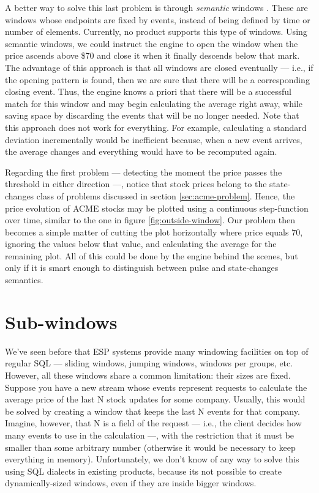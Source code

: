 \documentclass[a4,11pt]{report}
\begin{document}
A better way to solve this last problem is through \emph{semantic}
windows \cite{semantic-windows}. These are windows whose endpoints are
fixed by events, instead of being defined by time or number of
elements. Currently, no product supports this type of windows. Using
semantic windows, we could instruct the engine to open the window when
the price ascends above \$70 and close it when it finally descends
below that mark. The advantage of this approach is that all windows
are closed eventually --- i.e., if the opening pattern is found, then
we are sure that there will be a corresponding closing event. Thus,
the engine knows a priori that there will be a successful match for
this window and may begin calculating the average right away, while
saving space by discarding the events that will be no longer
needed. Note that this approach does not work for everything. For
example, calculating a standard deviation incrementally would be
inefficient because, when a new event arrives, the average changes and
everything would have to be recomputed again.

Regarding the first problem --- detecting the moment the price passes
the threshold in either direction ---, notice that stock prices belong
to the state-changes class of problems discussed in section
\ref{sec:acme-problem}. Hence, the price evolution of ACME stocks may
be plotted using a continuous step-function over time, similar to the
one in figure \ref{fig:outside-window}. Our problem then becomes a
simple matter of cutting the plot horizontally where price equals 70,
ignoring the values below that value, and calculating the average for
the remaining plot. All of this could be done by the engine behind the
scenes, but only if it is smart enough to distinguish between pulse and
state-changes semantics.

\section{Sub-windows}

We've seen before that ESP systems provide many windowing facilities
on top of regular SQL --- sliding windows, jumping windows, windows
per groups, etc. However, all these windows share a common limitation:
their sizes are fixed. Suppose you have a new stream whose events
represent requests to calculate the average price of the last N stock
updates for some company. Usually, this would be solved by creating a
window that keeps the last N events for that company. Imagine,
however, that N is a field of the request --- i.e., the client decides
how many events to use in the calculation ---, with the restriction
that it must be smaller than some arbitrary number (otherwise it would
be necessary to keep everything in memory). Unfortunately, we don't
know of any way to solve this using SQL dialects in existing products,
because its not possible to create dynamically-sized windows, even if
they are inside bigger windows.
\end{document}

